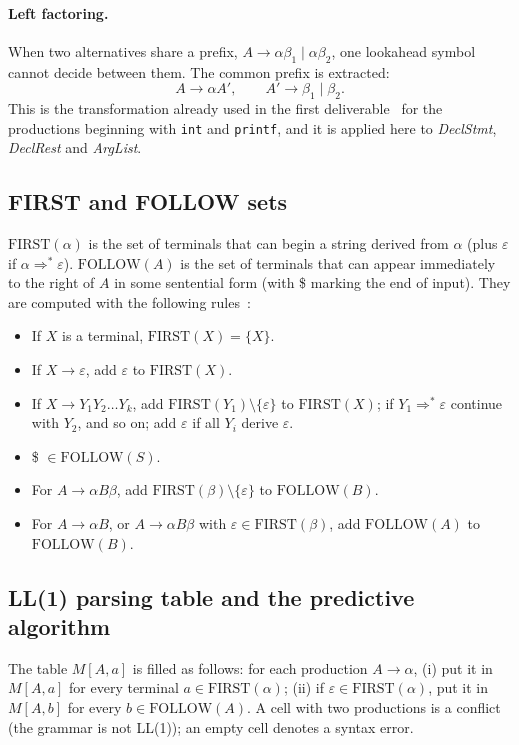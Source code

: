 \documentclass[11pt,a4paper]{article}
\newcommand{\eps}{\varepsilon}
\newcommand{\nt}[1]{\textit{#1}}
\newcommand{\tk}[1]{\texttt{#1}}
\begin{document}
\paragraph{Left factoring.} When two alternatives share a prefix, $A\to\alpha\beta_1\mid\alpha\beta_2$, one lookahead symbol cannot decide between them. The common prefix is extracted:
\[
A\to\alpha A',\qquad A'\to\beta_1\mid\beta_2 .
\]
This is the transformation already used in the first deliverable~\cite{lexer-report} for the productions beginning with \tk{int} and \tk{printf}, and it is applied here to \nt{DeclStmt}, \nt{DeclRest} and \nt{ArgList}.

\subsection{FIRST and FOLLOW sets}
$\mathrm{FIRST}(\alpha)$ is the set of terminals that can begin a string derived from $\alpha$ (plus $\eps$ if $\alpha\Rightarrow^{*}\eps$). $\mathrm{FOLLOW}(A)$ is the set of terminals that can appear immediately to the right of $A$ in some sentential form (with \$ marking the end of input). They are computed with the following rules~\cite{aho}:
\begin{itemize}[noitemsep]
  \item If $X$ is a terminal, $\mathrm{FIRST}(X)=\{X\}$.
  \item If $X\to\eps$, add $\eps$ to $\mathrm{FIRST}(X)$.
  \item If $X\to Y_1Y_2\ldots Y_k$, add $\mathrm{FIRST}(Y_1)\setminus\{\eps\}$ to $\mathrm{FIRST}(X)$; if $Y_1\Rightarrow^{*}\eps$ continue with $Y_2$, and so on; add $\eps$ if all $Y_i$ derive $\eps$.
  \item \$ $\in\mathrm{FOLLOW}(S)$.
  \item For $A\to\alpha B\beta$, add $\mathrm{FIRST}(\beta)\setminus\{\eps\}$ to $\mathrm{FOLLOW}(B)$.
  \item For $A\to\alpha B$, or $A\to\alpha B\beta$ with $\eps\in\mathrm{FIRST}(\beta)$, add $\mathrm{FOLLOW}(A)$ to $\mathrm{FOLLOW}(B)$.
\end{itemize}

\subsection{LL(1) parsing table and the predictive algorithm}
The table $M[A,a]$ is filled as follows: for each production $A\to\alpha$, (i) put it in $M[A,a]$ for every terminal $a\in\mathrm{FIRST}(\alpha)$; (ii) if $\eps\in\mathrm{FIRST}(\alpha)$, put it in $M[A,b]$ for every $b\in\mathrm{FOLLOW}(A)$. A cell with two productions is a conflict (the grammar is not LL(1)); an empty cell denotes a syntax error.
\end{document}
